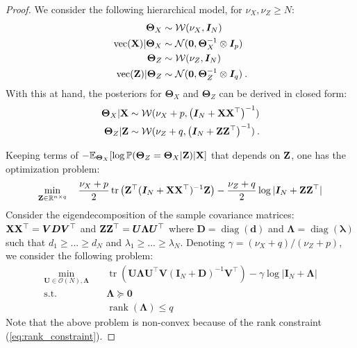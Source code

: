 \begin{proof}
We consider the following hierarchical model, for $\nu_{X}, \nu_{Z} \geq N$:
\begin{align*}
    \bm{\Theta}_{X} &\sim  \mathcal{W}(\nu_{X}, \bm{I}_N) \\
    \mathrm{vec}(\mathbf{X}) | \bm{\Theta}_{X} &\sim \mathcal{N}(\bm{0}, \bm{\Theta}_{X}^{-1} \otimes \bm{I}_p) \\
    \bm{\Theta}_{Z} &\sim  \mathcal{W}(\nu_{Z}, \bm{I}_N) \\
    \mathrm{vec}(\mathbf{Z}) | \bm{\Theta}_{Z} &\sim \mathcal{N}(\bm{0}, \bm{\Theta}_{Z}^{-1} \otimes \bm{I}_q) \:.
\end{align*}
With this at hand, the posteriors for $\bm{\Theta}_X$ and $\bm{\Theta}_Z$ can be derived in closed form: 
\begin{align*}
    \bm{\Theta}_{X} | \mathbf{X} &\sim  \mathcal{W}(\nu_{X}+p, \left(\bm{I}_N + \mathbf{X} \mathbf{X}^\top\right)^{-1}) \\
    \bm{\Theta}_{Z} | \mathbf{Z} &\sim  \mathcal{W}(\nu_{Z} + q, \left(\bm{I}_N + \mathbf{Z} \mathbf{Z}^\top\right)^{-1}) \:.
\end{align*}

Keeping terms of $-\mathbb{E}_{\bm{\Theta}_{X}}[\log \mathbb{P}(\bm{\Theta}_{Z} = \bm{\Theta}_{X}| \mathbf{Z} )| \mathbf{X}]$ that depends on $\mathbf{Z}$, one has the optimization problem:
\begin{align*}
    \min_{\mathbf{Z} \in \mathbb{R}^{n \times q}} \quad \frac{\nu_{X}+p}{2}\operatorname{tr}\left(\mathbf{Z}^\top(\bm{I}_N +  \mathbf{X}\mathbf{X}^\top)^{-1}\mathbf{Z}\right) - \frac{\nu_{Z}+q}{2}\log |\bm{I}_N +  \mathbf{Z}\mathbf{Z}^\top|
\end{align*}
Consider the eigendecomposition of the sample covariance matrices: $\mathbf{X}\mathbf{X}^\top = \bm{V D} \bm{V}^\top$ and $\mathbf{Z}\mathbf{Z}^\top = \bm{U \Lambda} \bm{U}^\top$ where $\bm{D}=\operatorname{diag}(\bm{d})$ and $\bm{\Lambda}=\operatorname{diag}(\bm{\lambda})$ such that $d_1 \geq ... \geq d_N$ and $\lambda_1 \geq ... \geq \lambda_N$. Denoting $\gamma = (\nu_{X}+q)/(\nu_{Z}+p)$, we consider the following problem:
\begin{align}
   \min_{\bm{U} \in \mathcal{O}(N), \bm{\Lambda}} \quad & \operatorname{tr}\left(\bm{U} \bm{\Lambda} \bm{U}^\top \bm{V} (\bm{I}_N + \bm{D})^{-1} \bm{V}^\top\right) - \gamma \log |\bm{I}_N + \bm{\Lambda}| \label{eq:optim_eigenvalues_eigenvectors} \\
    \textrm{s.t.} \quad & \bm{\Lambda} \succcurlyeq \bm{0} \label{eq:positive_definite_constraint}\\
    & \operatorname{rank}(\bm{\Lambda}) \leq q \label{eq:rank_constraint}
\end{align}
Note that the above problem is non-convex because of the rank constraint (\ref{eq:rank_constraint}). 


\end{proof}
